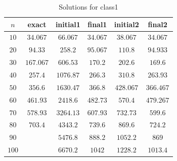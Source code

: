 \documentclass[a4paper, 11pt]{article}
\begin{document}
	\begin{table}[H]
		\centering
		\begin{tabular}{c|c|c|c|c|c}
			\textbf{$ n $} 	& \textbf{exact} & \textbf{initial1}   & \textbf{final1}& \textbf{initial2} & \textbf{final2} 	\\ \hline
			$ 10  $			& $ 34.067 $ 	& $ 66.067 $ 			& $ 34.067 $  	& $ 38.067 $ 		& $ 34.067 $		\\ \hline
			$ 20  $			& $ 94.33 $ 	& $ 258.2 $ 			& $ 95.067 $  	& $ 110.8 $ 		& $ 94.933 $		\\ \hline
			$ 30  $			& $ 167.067 $ 	& $ 606.53 $ 			& $ 170.2 $  	& $ 202.6 $ 		& $ 169.6 $ \\ \hline
			$ 40  $			& $ 257.4 $ 	& $ 1076.87 $ 			& $ 266.3 $  	& $ 310.8 $ 		& $ 263.93 $ \\ \hline
			$ 50  $			& $ 356.6 $ 	& $ 1630.47 $ 			& $ 366.8 $  	& $ 428.067 $ 		& $ 366.467 $ \\ \hline
			$ 60  $			& $ 461.93 $ 	& $ 2418.6 $ 			& $ 482.73 $  	& $ 570.4 $ 		& $ 479.267 $ \\ \hline
			$ 70 $			& $ 578.93 $ 	& $ 3264.13 $ 			& $ 607.93 $  	& $ 732.73 $ 		& $ 599.6 $ \\ \hline
			$ 80 $			& $ 703.4 $ 	& $ 4343.2 $ 			& $ 739.6 $  	& $ 869.6 $ 		& $ 724.2 $ \\ \hline
			$ 90 $			& $  $ 		& $ 5476.8 $ 			& $ 888.2 $  	& $ 1052.2 $ 		& $ 869 $ \\ \hline
			$ 100 $			& $  $ 		& $ 6670.2 $ 			& $ 1042 $  	& $ 1228.2 $ 		& $ 1013.4 $ \\
		\end{tabular}
		\caption{Solutions for class1}
		\label{table:sols}
	\end{table}
	
\end{document}
